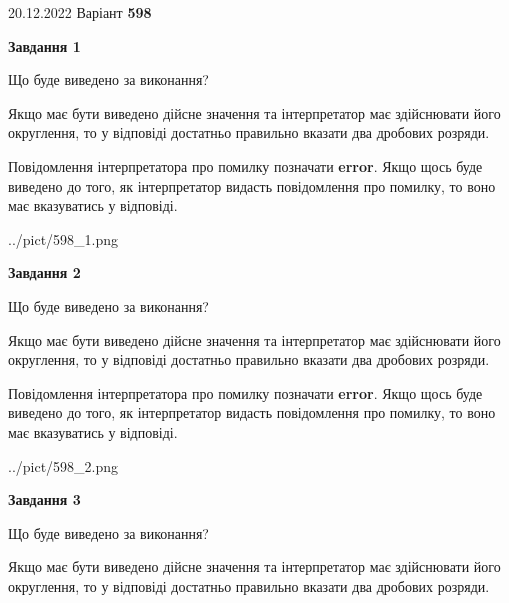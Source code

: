 \documentclass[12pt, ukrainian]{article}
\begin{document}
{20.12.2022 Варіант \No \textbf { 598 }\par}
{
\begin {Large}

{\begin {center}\textbf{Завдання 1}\end {center}}\par
Що буде виведено за виконання? \par

Якщо має бути виведено дійсне значення та інтерпретатор має здійснювати його округлення, 
то у відповіді достатньо правильно вказати два дробових розряди.

Повідомлення інтерпретатора про помилку позначати \textbf{error}.
Якщо щось буде виведено до того, як інтерпретатор видасть повідомлення про помилку, 
то воно має вказуватись у відповіді. \par

\begin{center}
	{../pict/598_1.png}
\end{center}
\newpage

{\begin {center}\textbf{Завдання 2}\end {center}}\par
Що буде виведено за виконання? \par

Якщо має бути виведено дійсне значення та інтерпретатор має здійснювати його округлення, 
то у відповіді достатньо правильно вказати два дробових розряди.

Повідомлення інтерпретатора про помилку позначати \textbf{error}.
Якщо щось буде виведено до того, як інтерпретатор видасть повідомлення про помилку, 
то воно має вказуватись у відповіді. \par

\begin{center}
	{../pict/598_2.png}
\end{center}
\newpage

{\begin {center}\textbf{Завдання 3}\end {center}}\par
Що буде виведено за виконання? \par

Якщо має бути виведено дійсне значення та інтерпретатор має здійснювати його округлення, 
то у відповіді достатньо правильно вказати два дробових розряди.


\end{Large}}
\end{document}

